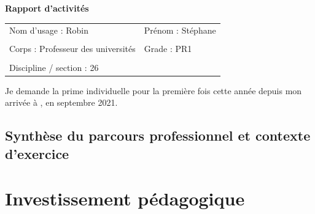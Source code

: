 \documentclass[12pt, a4paper, french]{article}
\begin{document}

\noindent
{\huge\bf Rapport d'activités}

% 

\bigskip
\noindent
\begin{tabular}{p{}p{}}
  \hline
  Nom d'usage : {\sc Robin} & Prénom : Stéphane \\ 
  \\
  Corps : Professeur des universités & Grade : PR1 \\
  \\
  Discipline / section : 26 \\
  \hline
\end{tabular}


\bigskip \bigskip
\noindent
Je demande la prime individuelle pour la première fois cette année depuis mon arrivée à \SU , en septembre 2021.

\subsection*{Synthèse du parcours professionnel et contexte d’exercice} 


\section{Investissement pédagogique \label{sec:ens}}

\end{document}
